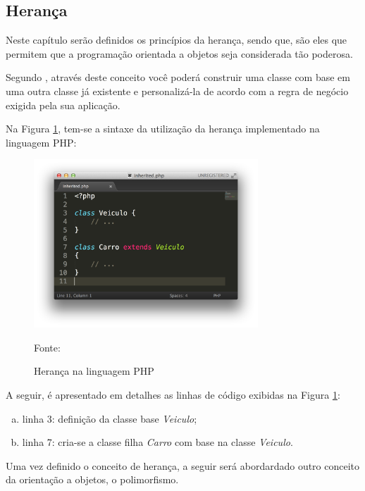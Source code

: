 \subsection{Herança}

Neste capítulo serão definidos os princípios da herança, sendo que, são eles que
permitem que a programação orientada a objetos seja considerada tão poderosa.

Segundo , através deste conceito você poderá
construir uma classe com base em uma outra classe já existente e personalizá-la
de acordo com a regra de negócio exigida pela sua aplicação.

Na Figura \ref{fig:heranca}, tem-se a sintaxe da utilização da herança
implementado na linguagem \acs{PHP}:

\begin{figure}[h!tb]
	\caption{Herança na linguagem PHP}
	\label{fig:heranca}

	\centering
	\includegraphics[width=0.75\textwidth]{images/inherited.png}

	\centering
	\footnotesize Fonte: \fonteOAutor
\end{figure}

\FloatBarrier 	%

A seguir, é apresentado em detalhes as linhas de código exibidas na Figura 
\ref{fig:heranca}:

\begin{enumerate}[a)]
    \item linha 3: definição da classe base \textit{Veiculo};
    \item linha 7: cria-se a classe filha \textit{Carro} com base na classe
    \textit{Veiculo}.
\end{enumerate}

Uma vez definido o conceito de herança, a seguir será abordardado outro conceito
da orientação a objetos, o polimorfismo.
